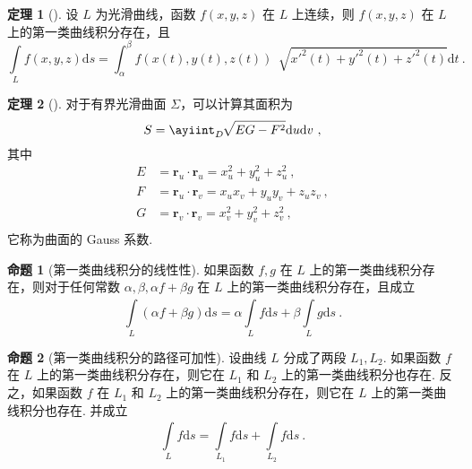 \documentclass[zihao=-4,linespread=1.8,UTF8,nothm]{aytony_base}
\theoremstyle{definition}
\newtheorem{theorem}{\indent\heiti\textbf{定理}}[subsection]
\newtheorem*{proposition*}{\indent\heiti\textbf{命题}}
\begin{document}
\begin{theorem}[]
    设 $L$ 为光滑曲线，函数 $f(x, y, z)$ 在 $L$ 上连续，则 $f(x, y, z)$ 在 $L$ 上的第一类曲线积分存在，且 $$
        \int\limits_{L}^{}f(x, y, z)\mathrm{d}s = \int_{\alpha}^{\beta}f(x(t), y(t), z(t))\,\sqrt[]{x'^2(t) + y'^2(t) + z'^2(t)}\mathrm{d}t\ .
    $$
\end{theorem}

\begin{theorem}[]
    对于有界光滑曲面 $\varSigma$，可以计算其面积为 $$
        S = \ayiint_{D}^{}\,\sqrt[]{EG - F^2}\mathrm{d}u \mathrm{d}v\ ,
    $$ 其中 $$
        \begin{aligned}
            E & = \mathbf{r}_u \cdot \mathbf{r}_u = x_u^2  + y_u^2 + z_u^2\ ,    \\
            F & = \mathbf{r}_u \cdot \mathbf{r}_v = x_ux_v  + y_uy_v + z_uz_v\ , \\
            G & = \mathbf{r}_v \cdot \mathbf{r}_v = x_v^2  + y_v^2 + z_v^2\ ,    \\
        \end{aligned}
    $$ 它称为曲面的 Gauss 系数.
\end{theorem}

\begin{proposition*}[第一类曲线积分的线性性]
    如果函数 $f, g$ 在 $L$ 上的第一类曲线积分存在，则对于任何常数 $\alpha, \beta, \alpha f + \beta g$ 在 $L$ 上的第一类曲线积分存在，且成立 $$
        \int\limits_{L}^{}(\alpha f + \beta g)\mathrm{d}s = \alpha \int\limits_{L}^{}f\mathrm{d}s + \beta \int\limits_{L}^{}g\mathrm{d}s\ .
    $$
\end{proposition*}

\begin{proposition*}[第一类曲线积分的路径可加性]
    设曲线 $L$ 分成了两段 $L_1, L_2$. 如果函数 $f$ 在 $L$ 上的第一类曲线积分存在，则它在 $L_1$ 和 $L_2$ 上的第一类曲线积分也存在. 反之，如果函数 $f$ 在 $L_1$ 和 $L_2$ 上的第一类曲线积分存在，则它在 $L$ 上的第一类曲线积分也存在. 并成立 $$
        \int\limits_{L}^{}f\mathrm{d}s = \int\limits_{L_1}^{}f\mathrm{d}s + \int\limits_{L_2}^{}f\mathrm{d}s\ .
    $$
\end{proposition*}
\end{document}
